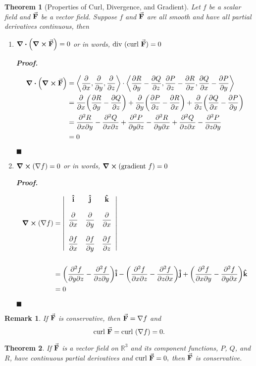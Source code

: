 \documentclass[12pt,a4paper]{article}
\newtheorem{thm}{Theorem}[subsection]
\newtheorem*{rmk}{\indent Remark}
\newenvironment*{prf}{\par\indent\textbf{\textit{Proof. }}\par}{\par\hfill$\blacksquare$\par}
\def\dsst{\displaystyle}
\def\R{{\mathbb{R}}}
\def\veci{\vu{\boldsymbol{\textbf{i}}}}
\def\vecj{\vu{\boldsymbol{\textbf{j}}}}
\def\veck{\vu{\boldsymbol{\textbf{k}}}}
\def\F{\va{\boldsymbol{\textbf{F}}}}
\def\Div{\text{div }}
\def\Curl{\text{curl }}
\begin{document}
\begin{thm}[Properties of Curl, Divergence, and Gradient]
	Let $f$ be a scalar field and $\F$ be a vector field. Suppose $f$ and $\F$ are all smooth and have all partial derivatives continuous, then 
	\begin{enumerate}
		\item $\div(\curl\F)=0$ or in words, $\Div(\Curl\F)=0$
		\begin{prf}
			\[\begin{aligned}\div(\curl\F)&=\left\langle\pdv{x},\pdv{y},\pdv{z}\right\rangle\cdot\left\langle\pdv{R}{y}-\pdv{Q}{z},\pdv{P}{z}-\pdv{R}{x},\pdv{Q}{x}-\pdv{P}{y}\right\rangle\\&=\pdv{x}\qty(\pdv{R}{y}-\pdv{Q}{z})+\pdv{y}\qty(\pdv{P}{z}-\pdv{R}{x})+\pdv{z}\qty(\pdv{Q}{x}-\pdv{P}{y})\\&=\pdv{R}{x}{y}-\pdv{Q}{x}{z}+\pdv{P}{y}{z}-\pdv{R}{y}{x}+\pdv{Q}{z}{x}-\pdv{P}{z}{y}\\&=0\end{aligned}\]
		\end{prf}
		\item $\curl(\nabla f)=0$ or in words, $\curl(\text{gradient }f)=0$
		\begin{prf}
			\[\begin{aligned}\curl(\nabla f)&=\qty|\begin{array}{ccc}\veci&\vecj&\veck\\\\\dsst\pdv{x}&\dsst\pdv{y}&\dsst\pdv{x}\\\\\dsst\pdv{f}{x}&\dsst\pdv{f}{y}&\dsst\pdv{f}{z}\end{array}|\\\\&=\qty(\pdv{f}{y}{z}-\pdv{f}{z}{y})\veci-\qty(\pdv{f}{x}{z}-\pdv{f}{z}{x})\vecj+\qty(\pdv{f}{x}{y}-\pdv{f}{y}{x})\veck\\&=0\end{aligned}\]
		\end{prf}
	\end{enumerate}
\end{thm}
\begin{rmk}
	If $\F$ is conservative, then $\F=\nabla f$ and \[\Curl\F=\Curl(\nabla f)=0.\]	
\end{rmk}
\begin{thm}\label{thm5.5.2}
	If $\F$ is a vector field on $\R^3$ and its component functions, $P$, $Q$, and $R$, have continuous partial derivatives and $\Curl\F=0,$ then $\F$ is conservative.	
\end{thm}
\end{document}

